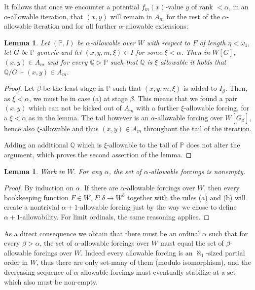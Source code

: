 \documentclass[a4paper,11pt]{article}
\newtheorem{lemma}[theorem]{Lemma}
\newcommand{\forceP}{\mathbb{P}}
\newcommand{\forceQ}{\mathbb{Q}}
\begin{document}
It follows that once we encounter a potential $f_m(x)$-value $y$ of rank $<\alpha$, in an $\alpha$-allowable iteration, that $(x,y)$ will remain in $A_m$ for the rest of the $\alpha$-allowable iteration and for all further $\alpha$-allowable extensions: 
\begin{lemma}\label{fvaluesremain2}
Let $(\forceP,I)$ be $\alpha$-allowable over $W$ with respect to $F$ of length $\eta < \omega_1$, let $G$ be $\forceP$-generic and let $(x,y,m,\xi) \in I$ for some $\xi < \alpha$. Then in $W[G]$, $(x,y) \in A_m$ and for every $\forceQ \triangleright \forceP$ such that $\forceQ$ is $\xi$ allowable it holds that $\forceQ \slash G \Vdash (x,y) \in A_m$.
\end{lemma}
\begin{proof}
Let $\beta$ be the least stage in $\forceP$ such that $(x,y,m,\xi)$ is added to $I_{\beta}$. Then, as $\xi < \alpha$, we must be in case (a) at stage $\beta$.
This means that we found a pair $(x,y)$ which can not be kicked out of $A_m$ with a further $\xi$-allowable forcing, for a $\xi < \alpha$ as in the lemma. The tail however is an $\alpha$-allowable forcing over $W[G_{\beta}]$, hence also $\xi$-allowable and thus $(x,y) \in A_m$ throughout the tail of the iteration.

Adding an additional $\forceQ$ which is $\xi$-allowable to the tail of $\forceP$ does not alter the argument, which proves the second assertion of the lemma.
\end{proof}

\begin{lemma}
Work in $W$. For any $\alpha$, the set of $\alpha$-allowable forcings is nonempty.
\end{lemma}
\begin{proof}
By induction on $\alpha$. If there are $\alpha$-allowable forcings over $W$, then every bookkeeping function $F \in W$, $F: \delta \rightarrow W^3$  together with the rules (a) and (b) will create a nontrivial $\alpha+1$-allowable forcing just by the way we chose to define $\alpha+1$-allowability. For limit ordinals, the same reasoning applies.
\end{proof}

As a direct consequence we obtain that there must be an ordinal $\alpha$ such that for every $\beta> \alpha$, the set of $\alpha$-allowable forcings over $W$  must equal the set of $\beta$-allowable forcings over $W$. Indeed every allowable forcing is an $\aleph_1$-sized partial order in $W$, thus there are only set-many of them (modulo isomorphism), and the decreasing sequence of $\alpha$-allowable forcings must eventually stabilize at a set which also must be non-empty.
\end{document}

